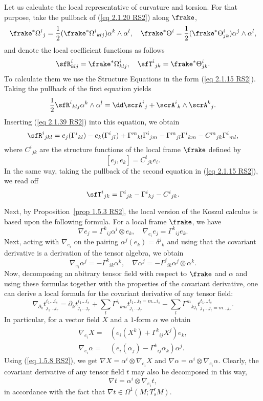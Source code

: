 Let us calculate the local representative of curvature and torsion. For that purpose, take the pullback of (\ref{eq 2.1.20 RS2}) along $\frake$,
\[\frake^\ast \Omega^i{}_j=\frac12(\frake^\ast\Omega^i{}_{klj})\alpha^k\wedge\alpha^l,\quad \frake^\ast\Theta^i=\frac12(\frake^\ast\Theta^i_{jk})\alpha^j\wedge\alpha^l,\]
and denote the local coefficient functions as follows 
\[\sfR^i_{klj}=\frake^\ast\Omega^i_{klj},\quad \sfT^i{}_{jk}=\frake^\ast\Theta^i_{jk}.\]
To calculate them we use the Structure Equations in the form (\ref{eq 2.1.15 RS2}). Taking the pullback of the first equation yields 
\[\frac12\sfR^i{}_{klj}\alpha^k\wedge\alpha^l=\dd\scrA^i{}_j+\scrA^i{}_k\wedge \scrA^k{}_j.\]
Inserting (\ref{eq 2.1.39 RS2}) into this equation, we obtain 
\[\sfR^i{}_{jkl}=e_j(\Gamma^i{}_{kl})-e_k(\Gamma^i{}_{jl})+\Gamma^m{}_{kl}\Gamma^i{}_{jm}-\Gamma^m{}_{jl}\Gamma^i{}_{km}-C^m{}_{jk}\Gamma^i{}_{ml},\label{eq 2.1.42 RS2}\]
where $C^i{}_{jk}$ are the structure functions of the local frame $\frake$ defined by 
\[[e_j,e_k]=C^i{}_{jk}e_i.\]
In the same way, taking the pullback of the second equation in (\ref{eq 2.1.15 RS2}), we read off 
\[\sfT^i{}_{jk}=\Gamma^i{}_{jk}-\Gamma^i{}_{kj}-C^i{}_{jk}.\label{eq 2.1.44 RS2}\]

Next, by Proposition~\ref{prop 1.5.3 RS2}, the local version of the Koszul calculus is based upon the following formula. For a local frame $\frake$, we have 
\[\nabla e_j=\Gamma^k{}_{ij}\alpha^i\otimes e_k, \quad \nabla_{e_i}e_j=\Gamma^k{}_{ij}e_k. \label{eq 2.1.45/46 RS2}\]
Next, acting with $\nabla_{e_i}$ on the pairing $\alpha^j(e_k)=\delta^j{}_k$ and using that the covariant derivative is a derivation of the tensor algebra, we obtain 
\[\nabla_{e_i}\alpha^j=-\Gamma^k{}_{ik}\alpha^k,\quad \nabla\alpha^j=-\Gamma^j{}_{ik}\alpha^j\otimes\alpha^k.\label{eq 2.1.47/48 RS2}\]
Now, decomposing an abitrary tensor field with respect to $\frake$ and $\alpha$ and using these formulas together with the properties of the covariant derivative, one can derive a local formula for the covariant derivative of any tensor field:
\[\nabla_{\partial_k}t_{j_1\ldots j_r}^{i_1\ldots i_s}=\partial_kt_{j_1\ldots j_r}^{i_1\ldots i_s}+\sum_l\Gamma^{i_l}{}_{km}t_{j_1\ldots j_r}^{t_1\ldots t_l=m\ldots i_s}-
\sum_l\Gamma^{m}{}_{kj_l}t_{j_1\ldots j_l=m\ldots  j_r}^{t_1\ldots i_s}.
\]
In particular, for a vector field $X$ and a $1$-form $\alpha$ we obtain 
\begin{align}
    \nabla_{e_i}X=&(e_i(X^k)+\Gamma^k{}_{ij}X^j)e_k,\label{eq 2.1.49 RS2}\\
    \nabla_{e_i}\alpha=&(e_i(\alpha_j)-\Gamma^k{}_{ij}\alpha_k)\alpha^j.\label{eq 2.1.50 RS2}
\end{align}
Using (\ref{eq 1.5.8 RS2}), we get $\nabla X=\alpha^i\otimes\nabla_{e_i}X$ and $\nabla\alpha=\alpha^i\otimes\nabla_{e_i}\alpha$. Clearly, the covariant derivative of any tensor field $t$ may also be decomposed in this way,
\[\nabla t=\alpha^i\otimes \nabla_{e_i} t,\]
in accordance with the fact that $\nabla t\in\Omega^1(M;T^r_s M)$.

